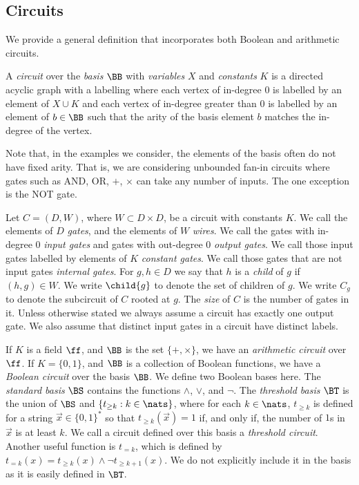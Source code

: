 \documentclass{toc}
\begin{document}
\subsection{Circuits}
We provide a general definition that incorporates both Boolean and arithmetic
circuits.
\begin{definition}[Circuit]
  A \emph{circuit} over the \emph{basis} $\BB$ with \emph{variables} $X$ and
  \emph{constants} $K$ is a directed acyclic graph with a labelling where each
  vertex of in-degree $0$ is labelled by an element of $X \cup K$ and each
  vertex of in-degree greater than $0$ is labelled by an element of $b \in \BB$ such that the arity of the basis element $b$ matches the in-degree of the vertex. %
\end{definition}
Note that, in the examples we consider, the elements of the basis
often do not have fixed arity.  That is, we are considering unbounded
fan-in circuits where gates such as AND, OR, $+$, $\times$ can take
any number of inputs.  The one exception is the NOT gate.

Let $C = (D, W)$, where $W \subset D \times D$, be a circuit with constants $K$.
We call the elements of $D$ \emph{gates}, and the elements of $W$ \emph{wires}.
We call the gates with in-degree $0$ \emph{input gates} and gates with
out-degree $0$ \emph{output gates}. We call those input gates labelled by
elements of $K$ \emph{constant gates}. We call those gates that are not input
gates \emph{internal gates}. For $g, h \in D$ we say that $h$ is a \emph{child}
of $g$ if $(h, g) \in W$. We write $\child{g}$ to denote the set of children of
$g$. We write $C_g$ to denote the %
subcircuit %
of $C$ rooted at $g$.  The \emph{size} of $C$ is the number of gates in it.
%
Unless
otherwise stated we always assume a circuit has exactly one output gate. We also assume that distinct input gates in a circuit have distinct labels.

If $K$ is a field $\ff$, and $\BB$ is the set $\{+, \times\}$, we have an
\emph{arithmetic circuit} over $\ff$. If $K = \{0,1\}$, and $\BB$ is a
collection of Boolean functions, we have a \emph{Boolean circuit} over the basis
$\BB$. We define two Boolean bases here. The \emph{standard basis} $\BS$
contains the functions $\land$, $\lor$, and $\neg$. The \emph{threshold basis}
$\BT$ is the union of $\BS$ and $\{t_{\geq k} : k \in \nats\}$, where for each
$k \in \nats$, $t_{\geq k}$ is defined for a string $\vec{x} \in \{0, 1\}^*$ so
that $t_{\geq k}(\vec{x}) = 1$ if, and only if, the number of $1$s in $\vec{x}$
is at least $k$. We call a circuit defined over this basis a \emph{threshold
  circuit}. Another useful function is $t_{=k}$, which is defined by $t_{=k}(x)
= t_{\geq k}(x) \land \neg t_{\geq k+1}(x)$. We do not explicitly include it in
the basis as it is easily defined in $\BT$.
\end{document}
